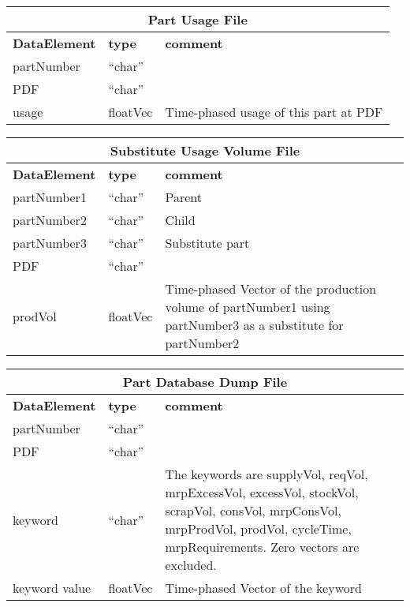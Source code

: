\begin{tabular}{llp{4in}}
\multicolumn{3}{c}{{\bf Part Usage File}}\\ \hline\hline
{\bf DataElement} &  {\bf type}  &   {\bf comment} \\ \hline
partNumber &  ``char''     \\ 
PDF   & ``char''  \\
usage          & floatVec &  Time-phased usage of this part at PDF\\
\end{tabular}

\vspace{.5in}

\begin{tabular}{llp{4in}}
\multicolumn{3}{c}{{\bf Substitute Usage Volume File}}\\ \hline\hline
{\bf DataElement} &  {\bf type}  &   {\bf comment} \\ \hline
partNumber1 & ``char''  & Parent\\
partNumber2 & ``char''  & Child \\
partNumber3 & ``char''  & Substitute part\\
PDF        & ``char''  \\
prodVol    & floatVec &  Time-phased Vector of the production volume of
                      partNumber1 using partNumber3 as a substitute for
                      partNumber2 \\
\end{tabular}

\vspace{.5in}

\begin{tabular}{llp{4in}}
\multicolumn{3}{c}{{\bf Part Database Dump File}}\\ \hline\hline
{\bf DataElement} &  {\bf type}  &   {\bf comment} \\ \hline
partNumber & ``char''  \\
PDF & ``char''  \\
keyword & ``char''  & The keywords are supplyVol, reqVol, mrpExcessVol, excessVol,
   stockVol, scrapVol, consVol, mrpConsVol, mrpProdVol, prodVol, cycleTime,
   mrpRequirements.
   Zero vectors are excluded.\\
keyword value  & floatVec &  Time-phased Vector of the keyword \\
\end{tabular}

\vspace{.5in}

